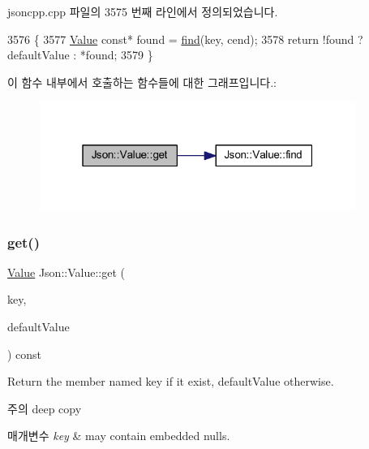 jsoncpp.\+cpp 파일의 3575 번째 라인에서 정의되었습니다.


\begin{DoxyCode}
3576 \{
3577   \hyperlink{class_json_1_1_value}{Value} \textcolor{keyword}{const}* found = \hyperlink{class_json_1_1_value_afb007b9ce9b2cf9d5f667a07e5e0349f}{find}(key, cend);
3578   \textcolor{keywordflow}{return} !found ? defaultValue : *found;
3579 \}
\end{DoxyCode}
이 함수 내부에서 호출하는 함수들에 대한 그래프입니다.\+:\nopagebreak
\begin{figure}[H]
\begin{center}
\leavevmode
\includegraphics[width=292pt]{class_json_1_1_value_aa59ed050e87e1d58d93671a38687f36c_cgraph}
\end{center}
\end{figure}
\mbox{\label{class_json_1_1_value_a7406e6af727c288bf8ab59945ece686a}} 
\subsubsection{\texorpdfstring{get()}{get()}\hspace{0.1cm}{\footnotesize\ttfamily [4/4]}}
{\footnotesize\ttfamily \hyperlink{class_json_1_1_value}{Value} Json\+::\+Value\+::get (\begin{DoxyParamCaption}\item[{const \hyperlink{json_8h_a1e723f95759de062585bc4a8fd3fa4be}{J\+S\+O\+N\+C\+P\+P\+\_\+\+S\+T\+R\+I\+NG} \&}]{key,  }\item[{const \hyperlink{class_json_1_1_value}{Value} \&}]{default\+Value }\end{DoxyParamCaption}) const}

Return the member named key if it exist, default\+Value otherwise. \begin{DoxyNote}{주의}
deep copy 
\end{DoxyNote}

\begin{DoxyParams}{매개변수}
{\em key} & may contain embedded nulls. \\
\hline
\end{DoxyParams}


